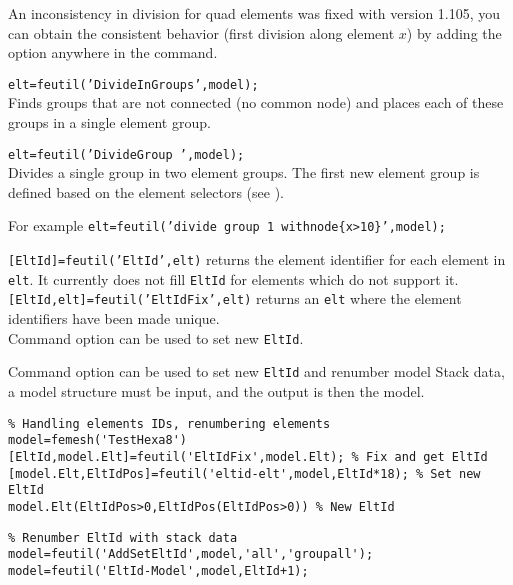 An inconsistency in division for quad elements was fixed with version 1.105, you can obtain the consistent behavior (first division along element $x$) by adding the option  anywhere in the  command.

{\tt elt=feutil('DivideInGroups',model);}\\
Finds groups that are not connected (no common node) and places each of these groups in a single element group.

{\tt elt=feutil('DivideGroup ',model);}\\

Divides a single group  in two element groups. The first new element group is defined based on the element selectors (see ).

For example 
{\tt elt=feutil('divide group 1 withnode\{x>10\}',model);}


{\tt [EltId]=feutil('EltId',elt)} returns the element identifier for each element in {\tt elt}. It currently does not fill {\tt EltId} for elements which do not support it. \\ 
{\tt [EltId,elt]=feutil('EltIdFix',elt)} returns an {\tt elt} where the element identifiers have been made unique.\\
Command option  can be used to set new {\tt EltId}.\\
\begin{SDT}
Command option  can be used to set new {\tt EltId} and renumber model Stack data, a model structure must be input, and the output is then the model.
\end{SDT}

\begin{verbatim}
% Handling elements IDs, renumbering elements
model=femesh('TestHexa8')
[EltId,model.Elt]=feutil('EltIdFix',model.Elt); % Fix and get EltId
[model.Elt,EltIdPos]=feutil('eltid-elt',model,EltId*18); % Set new EltId
model.Elt(EltIdPos>0,EltIdPos(EltIdPos>0)) % New EltId
\end{verbatim}%

\begin{SDT}
\begin{verbatim}
% Renumber EltId with stack data
model=feutil('AddSetEltId',model,'all','groupall');
model=feutil('EltId-Model',model,EltId+1);
\end{verbatim}%
\end{SDT}

